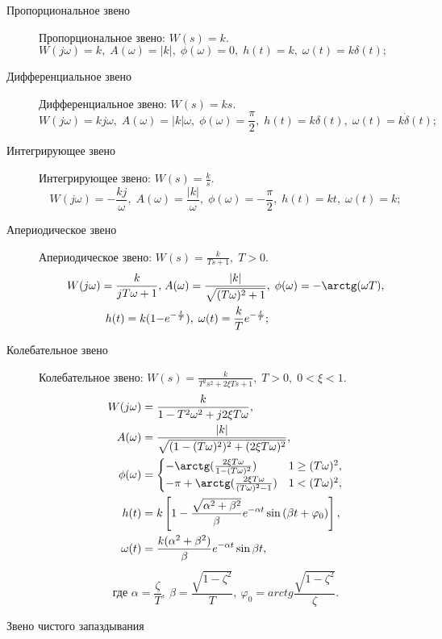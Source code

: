 \documentclass[../../TAU.tex]{subfiles}
\begin{document}
\begin{description}
\item[Пропорциональное звено] %
    Пропорциональное звено: $W(s)=k$.  
    $W(j\omega) = k,\; A(\omega) = |k|,\; \phi(\omega) = 0,\; h(t) = k,\; \omega(t) = k\delta(t);$
\item[Дифференциальное звено] %
    Дифференциальное звено: $W(s) = ks$.
    $$
        W(j\omega) = kj\omega,\; A(\omega) = |k|\omega, \; \phi(\omega) = \frac{\pi}{2},\; h(t) = k\delta(t),\; \omega(t) = k\dot\delta(t);
    $$
\item[Интегрирующее звено] %
    Интегрирующее звено: $W(s) = \frac{k}{s}$.
    $$
        W(j\omega) = -\frac{k j}{\omega},\; A(\omega) = \frac{|k|}{\omega},\; \phi(\omega) = -\frac{\pi}{2},\; h(t) = kt,\; \omega(t) = k;
    $$
\item[Апериодическое звено] %
    Апериодическое звено: $W(s) = \frac{k}{Ts+1},\; T>0$.
    $$
        \begin{aligned}
            W(j\omega) = \frac{k}{jT\omega+1},\; &A(\omega) = \frac{|k|}{\sqrt{(T\omega)^2+1}},\; \phi(\omega) = -\arctg(\omega T),\\ h(t) = k(1-&e^{-\frac{t}{T}}),\; \omega(t) = \frac{k}{T}e^{-\frac{t}{T}};
        \end{aligned}
    $$
\item[Колебательное звено] %
    Колебательное звено: $W(s) = \frac{k}{T^2s^2+2\xi Ts+1},\; T>0,\; 0 < \xi < 1.$
    $$
        \begin{aligned}
            W(j\omega) &= \frac{k}{1-T^2\omega^2 +j2\xi T\omega},\\
            A(\omega) &= \frac{|k|}{\sqrt{(1-(T\omega)^2)^2 + (2\xi T\omega)^2}},\\
            \phi(\omega) &=
            \begin{cases}
                -\arctg(\frac{2\xi T\omega}{1-(T\omega)^2}) & 1 \ge (T\omega)^2,\\
                -\pi+\arctg(\frac{2\xi T\omega}{(T\omega)^2-1}) & 1 < (T\omega)^2,
            \end{cases}\\
            h(t) &= k\left[1-\frac{\sqrt{\alpha^2+\beta^2}}{\beta} e^{-\alpha t} \sin{(\beta t+\varphi_0)}\right],\\
            \omega(t) &= \frac{k (\alpha^2 + \beta^2)}{\beta} e^{-\alpha t} \sin{\beta  t},
        \end{aligned}
    $$
    $$
        \text{где } \alpha = \frac{\zeta}{T},\ \beta=\frac{\sqrt{1-\zeta^2}}{T},\ \varphi_0=arctg{\frac{\sqrt{1-\zeta^2}}{\zeta}}.
    $$
\item[Звено чистого запаздывания] %


\end{description}
\end{document}
